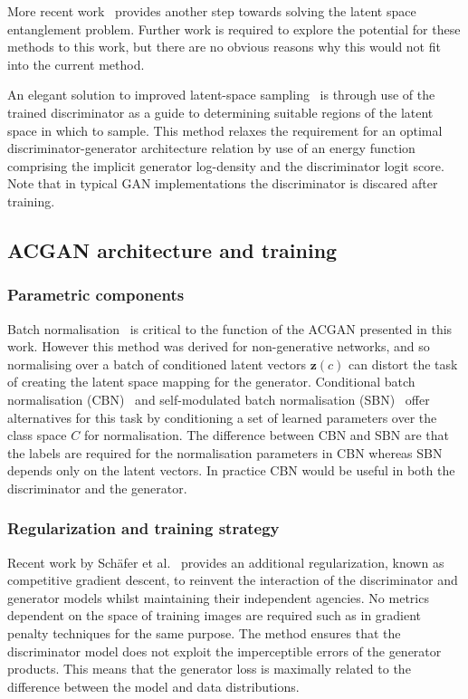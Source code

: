 \documentclass[twocolumn]{article}
\numberwithin{equation}{section}
\begin{document}
More recent work~\cite{latent_disentanglement} provides another step towards solving the latent space entanglement problem.
Further work is required to explore the potential for these methods to this work, but there are no obvious reasons why this
would not fit into the current method. 

An elegant solution to improved latent-space sampling~\cite{discriminator_z_sampling} is through use of the trained discriminator 
as a guide to determining suitable regions of the latent space in which to sample. This method relaxes the requirement for an 
optimal discriminator-generator architecture relation by use of an energy function comprising the implicit generator log-density 
and the discriminator logit score. Note that in typical GAN implementations the discriminator is discared after training. 

\subsection{ACGAN architecture and training}
\subsubsection{Parametric components}
Batch normalisation~\cite{batchnorm} is critical to the function of the ACGAN presented in this work. However this method was derived for non-generative networks, and so normalising over a batch of conditioned latent vectors $\mathbf{z}(c)$ can distort the task of creating the latent space mapping for the generator. Conditional batch normalisation (CBN)~\cite{GAN_CBN} and self-modulated batch normalisation (SBN)~\cite{GAN_SBN} offer alternatives for this task by conditioning a set of learned parameters over the class space $C$ for normalisation. The difference between CBN and SBN are that the labels are required for the normalisation parameters in CBN whereas SBN depends only on the latent vectors. In practice CBN would be useful in both the discriminator and the generator.
\subsubsection{Regularization and training strategy}
Recent work by Sch\"{a}fer et al.~\cite{GAN_CGD1, GAN_CGD2} provides an additional regularization, known as competitive gradient descent, to reinvent the interaction of the discriminator and generator models whilst maintaining their independent agencies. No metrics dependent on the space of training images are required such as in gradient penalty techniques for the same purpose. The method ensures that the discriminator model does not exploit the imperceptible errors of the generator products. This means that the generator loss is maximally related to the difference between the model and data distributions.
\end{document}
